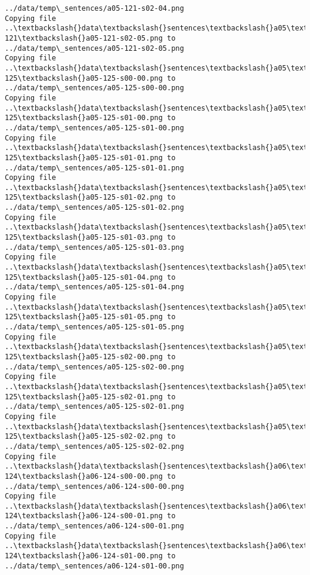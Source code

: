 \documentclass[11pt]{article}
\begin{document}
\begin{Verbatim}[commandchars=\\\{\}]
../data/temp\_sentences/a05-121-s02-04.png
Copying file ..\textbackslash{}data\textbackslash{}sentences\textbackslash{}a05\textbackslash{}a05-121\textbackslash{}a05-121-s02-05.png to
../data/temp\_sentences/a05-121-s02-05.png
Copying file ..\textbackslash{}data\textbackslash{}sentences\textbackslash{}a05\textbackslash{}a05-125\textbackslash{}a05-125-s00-00.png to
../data/temp\_sentences/a05-125-s00-00.png
Copying file ..\textbackslash{}data\textbackslash{}sentences\textbackslash{}a05\textbackslash{}a05-125\textbackslash{}a05-125-s01-00.png to
../data/temp\_sentences/a05-125-s01-00.png
Copying file ..\textbackslash{}data\textbackslash{}sentences\textbackslash{}a05\textbackslash{}a05-125\textbackslash{}a05-125-s01-01.png to
../data/temp\_sentences/a05-125-s01-01.png
Copying file ..\textbackslash{}data\textbackslash{}sentences\textbackslash{}a05\textbackslash{}a05-125\textbackslash{}a05-125-s01-02.png to
../data/temp\_sentences/a05-125-s01-02.png
Copying file ..\textbackslash{}data\textbackslash{}sentences\textbackslash{}a05\textbackslash{}a05-125\textbackslash{}a05-125-s01-03.png to
../data/temp\_sentences/a05-125-s01-03.png
Copying file ..\textbackslash{}data\textbackslash{}sentences\textbackslash{}a05\textbackslash{}a05-125\textbackslash{}a05-125-s01-04.png to
../data/temp\_sentences/a05-125-s01-04.png
Copying file ..\textbackslash{}data\textbackslash{}sentences\textbackslash{}a05\textbackslash{}a05-125\textbackslash{}a05-125-s01-05.png to
../data/temp\_sentences/a05-125-s01-05.png
Copying file ..\textbackslash{}data\textbackslash{}sentences\textbackslash{}a05\textbackslash{}a05-125\textbackslash{}a05-125-s02-00.png to
../data/temp\_sentences/a05-125-s02-00.png
Copying file ..\textbackslash{}data\textbackslash{}sentences\textbackslash{}a05\textbackslash{}a05-125\textbackslash{}a05-125-s02-01.png to
../data/temp\_sentences/a05-125-s02-01.png
Copying file ..\textbackslash{}data\textbackslash{}sentences\textbackslash{}a05\textbackslash{}a05-125\textbackslash{}a05-125-s02-02.png to
../data/temp\_sentences/a05-125-s02-02.png
Copying file ..\textbackslash{}data\textbackslash{}sentences\textbackslash{}a06\textbackslash{}a06-124\textbackslash{}a06-124-s00-00.png to
../data/temp\_sentences/a06-124-s00-00.png
Copying file ..\textbackslash{}data\textbackslash{}sentences\textbackslash{}a06\textbackslash{}a06-124\textbackslash{}a06-124-s00-01.png to
../data/temp\_sentences/a06-124-s00-01.png
Copying file ..\textbackslash{}data\textbackslash{}sentences\textbackslash{}a06\textbackslash{}a06-124\textbackslash{}a06-124-s01-00.png to
../data/temp\_sentences/a06-124-s01-00.png

\end{Verbatim}
\end{document}
